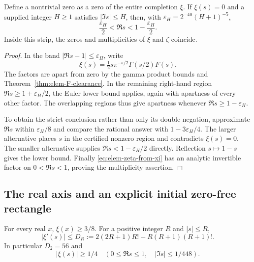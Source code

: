 \begin{theorem}
\label{thm:elem-strip}
Define a nontrivial zero as a zero of the entire completion $\xi$.
If $\xi(s)=0$ and a supplied integer $H\ge1$ satisfies $|\Im s|\le H$,
then, with $\varepsilon_H=2^{-40}(H+1)^{-5}$,
\begin{equation}
 \frac{\varepsilon_H}{2}<\Re s
 <1-\frac{\varepsilon_H}{2}.
 \label{eq:elem-quantitative-strip}
\end{equation}
Inside this strip, the zeros and multiplicities of $\xi$ and $\zeta$
coincide.
\end{theorem}

\begin{proof}
In the band $|\Re s-1|\le\varepsilon_H$, write
\[
 \xi(s)=\tfrac12s\pi^{-s/2}\Gamma(s/2)F(s).
\]
The factors are apart from zero by the gamma product bounds and
Theorem~\ref{thm:elem-F-clearance}.  In the remaining right-hand
region $\Re s\ge1+\varepsilon_H/2$, the Euler lower bound applies,
again with apartness of every other factor.  The overlapping regions
thus give apartness whenever $\Re s\ge1-\varepsilon_H$.

To obtain the strict conclusion rather than only its double negation,
approximate $\Re s$ within $\varepsilon_H/8$ and compare the rational
answer with $1-3\varepsilon_H/4$.  The larger alternative places $s$
in the certified nonzero region and contradicts $\xi(s)=0$.  The
smaller alternative supplies $\Re s<1-\varepsilon_H/2$ directly.
Reflection $s\mapsto1-s$ gives the lower bound.  Finally
\eqref{eq:elem-zeta-from-xi} has an analytic invertible factor on
$0<\Re s<1$, proving the multiplicity assertion.
\end{proof}

\subsection{The real axis and an explicit initial zero-free rectangle}

\begin{lemma}
\label{lem:elem-real-positive}
For every real $x$, $\xi(x)\ge3/8$.  For a positive integer $R$ and
$|s|\le R$,
\begin{equation}
 |\xi'(s)|\le D_R
 :=2(2R+1)R!+R(R+1)(R+1)!.
 \label{eq:elem-xi-derivative-bound}
\end{equation}
In particular $D_2=56$ and
\begin{equation}
 |\xi(s)|\ge1/4\quad
 (0\le\Re s\le1,\quad |\Im s|\le1/448).
 \label{eq:elem-initial-rectangle}
\end{equation}
\end{lemma}

